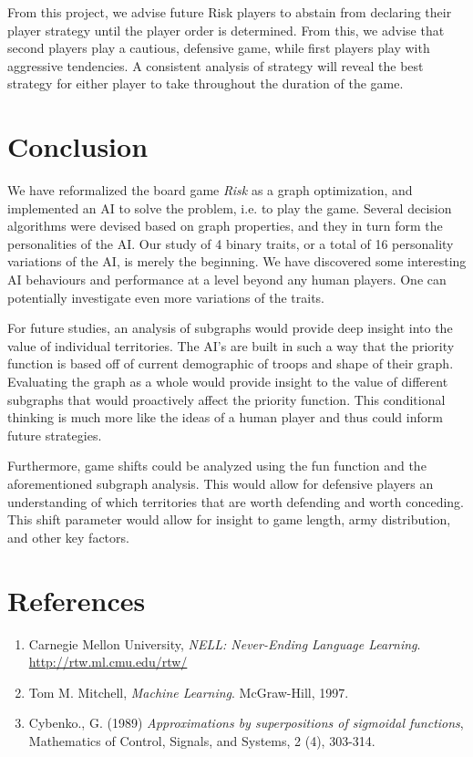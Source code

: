 \documentclass[12pt]{article}  %
\begin{document}
From this project, we advise future Risk players to abstain from declaring their player strategy until the player order is determined. From this, we advise that second players play a cautious, defensive game, while first players play with aggressive tendencies. A consistent analysis of strategy will reveal the best strategy for either player to take throughout the duration of the game. 



\section{Conclusion}
We have reformalized the board game \emph{Risk} as a graph optimization, and implemented an AI to solve the problem, i.e. to play the game. Several decision algorithms were devised based on graph properties, and they in turn form the personalities of the AI. Our study of 4 binary traits, or a total of 16 personality variations of the AI, is merely the beginning. We have discovered some interesting AI behaviours and performance at a level beyond any human players. One can potentially investigate even more variations of the traits.

For future studies, an analysis of subgraphs would provide deep insight into the value of individual territories. The AI’s are built in such a way that the priority function is based off of current demographic of troops and shape of their graph. Evaluating the graph as a whole would provide insight to the value of different subgraphs that would proactively affect the priority function. This conditional thinking is much more like the ideas of a human player and thus could inform future strategies. 

Furthermore, game shifts could be analyzed using the fun function and the aforementioned subgraph analysis. This would allow for defensive players an understanding of which territories that are worth defending and worth conceding. This shift parameter would allow for insight to game length, army distribution, and other key factors.  





\section{References}


\begin{enumerate}

\item Carnegie Mellon University, \emph{NELL: Never-Ending Language Learning}. \url{http://rtw.ml.cmu.edu/rtw/}\label{NELL}

\item Tom M. Mitchell, \emph{Machine Learning}. McGraw-Hill, 1997.\label{Mitchell}

\item Cybenko., G. (1989) \emph{Approximations by superpositions of sigmoidal functions}, Mathematics of Control, Signals, and Systems, 2 (4), 303-314. \label{Cybenko}


\end{enumerate}
\end{document}
